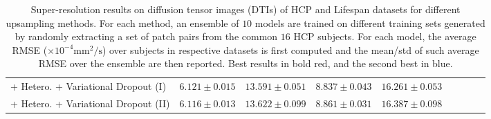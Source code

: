 \begin{table}
\begin{tabular}{@{}lclclclcl}
		+ Hetero. + Variational Dropout (I)   & \cellcolor{blue!15} $6.121\pm0.015$    &$13.591\pm0.051$   & \cellcolor{red!15} $\mathbf{8.837\pm0.043}$ &$16.261\pm0.053$\\ 
		+ Hetero. + Variational Dropout (II)  & \cellcolor{red!15} $\mathbf{6.116\pm0.013}$   &$13.622\pm0.099$   & \cellcolor{blue!15} $8.861\pm0.031$  &$16.387\pm0.098$\\
		\hline
	\end{tabular}%
	\vspace{-1mm}
\caption{Super-resolution results on diffusion tensor images (DTIs) of HCP and Lifespan datasets for different upsampling methods. For each method, an ensemble of $10$ models are trained on different training sets generated by randomly extracting a set of patch pairs from the common $16$ HCP subjects. For each model, the average RMSE ($\times 10^{-4} \text{mm}^2/\text{s} $) over subjects in respective datasets is first computed and the mean/std of such average RMSE over the ensemble are then reported. Best results in bold red, and the second best in blue. }
\label{tab:compare_1}	
\end{table}

